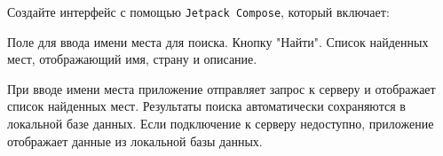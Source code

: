 Создайте интерфейс с помощью \texttt{Jetpack Compose}, который включает:

Поле для ввода имени места для поиска.
Кнопку "Найти".
Список найденных мест, отображающий имя, страну и описание.

При вводе имени места приложение отправляет запрос к серверу и отображает список найденных мест.
Результаты поиска автоматически сохраняются в локальной базе данных.
Если подключение к серверу недоступно, приложение отображает данные из локальной базы данных.

